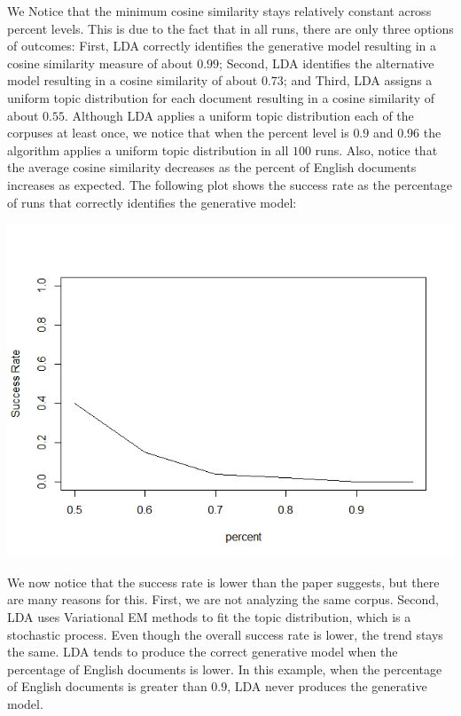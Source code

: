 \documentclass[12pt]{article}
\begin{document}
\noindent We Notice that the minimum cosine similarity stays relatively constant across percent levels. This is due to the fact that in all runs, there are only three options of outcomes:  First, LDA correctly identifies the generative model resulting in a cosine similarity measure of about $0.99$; Second, LDA identifies the alternative model resulting in a cosine similarity of about $0.73$; and Third, LDA assigns a uniform topic distribution for each document resulting in a cosine similarity of about $0.55$. Although LDA applies a uniform topic distribution each of the corpuses at least once, we notice that when the percent level is $0.9$ and $0.96$ the algorithm applies a uniform topic distribution in all $100$ runs. Also, notice that the average cosine similarity decreases as the percent of English documents increases as expected. The following plot shows the success rate as the percentage of runs that correctly identifies the generative model:  
\begin{center}
	\includegraphics[scale=0.5]{Images/plot_smallC.jpeg}
\end{center} 
\vspace{2mm}
We now notice that the success rate is lower than the paper suggests, but there are many reasons for this. First, we are not analyzing the same corpus. Second, LDA uses Variational EM methods to fit the topic distribution, which is a stochastic process. Even though the overall success rate is lower, the trend stays the same. LDA tends to produce the correct generative model when the percentage of English documents is lower. In this example, when the percentage of English documents is greater than $0.9$, LDA never produces the generative model.
\end{document}
